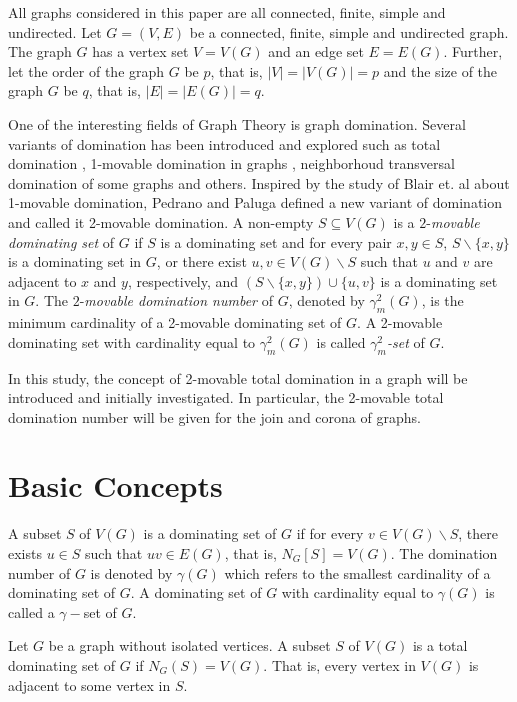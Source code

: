 \documentclass[twoside,12pt]{article}
\begin{document}
All graphs considered in this paper are all connected, finite, simple and undirected. Let $G=(V, E)$ be a connected, finite, simple and undirected graph. The graph $G$ has a vertex set $V=V(G)$ and an edge set $E=E(G)$. Further, let the order of the graph $G$ be $p$, that is, $|V|=|V(G)|=p$ and the size of the graph $G$ be $q$, that is, $|E|=|E(G)|=q$.

One of the interesting fields of Graph Theory is graph domination. Several variants of domination has been introduced and explored such as total domination \cite{3a}, 1-movable domination in graphs \cite{7}, neighborhoud transversal domination of some graphs \cite{b} and others. Inspired by the study of Blair et. al \cite{2} about 1-movable domination, Pedrano and Paluga \cite{p} defined a new variant of domination and called it 2-movable domination. A non-empty $S\subseteq V(G)$ is a $2$-\textit{movable dominating set} of $G$ if $S$ is a dominating set and for every pair $x,y \in S$, $S \backslash \{x, y\}$ is a dominating set in $G$, or there exist $u, v \in V(G) \backslash S$ such that $u$ and $v$ are adjacent to $x$ and $y$, respectively, and $(S \backslash \{x,y\}) \cup \{u,v\}$ is a dominating set in $G$. The $2$-\textit{movable domination number} of $G$, denoted by $\gamma_{m}^{2}(G)$, is the minimum cardinality of a 2-movable dominating set of $G$. A 2-movable dominating set with cardinality equal to $\gamma_{m}^{2}(G)$ is called \textit{$\gamma_{m}^{2}$-set} of $G$. 

In this study, the concept of 2-movable total domination in a graph will be introduced
and initially investigated. In particular, the 2-movable total domination number will be given for the join and corona of graphs.

\section{Basic Concepts}

\begin{definition}
	\cite{7} A subset $S$ of $V(G)$ is a dominating set of $G$ if for every $v \in V(G) \backslash S$, there exists $u \in S$ such that $uv \in E(G)$, that is, $N_G[S]=V(G)$. The domination number of $G$ is denoted by $\gamma(G)$ which refers to the smallest cardinality of a dominating set of $G$. A dominating set of $G$ with cardinality equal to $\gamma(G)$ is called a $\gamma-$set of $G$.
\end{definition}

\begin{definition}
	\cite{3a} Let $G$ be a graph without isolated vertices. A subset $S$ of $V(G)$ is a total dominating set of $G$ if $N_G(S)=V(G)$. That is, every vertex in $V(G)$ is adjacent to some vertex in $S$. 
\end{definition}
\end{document}
